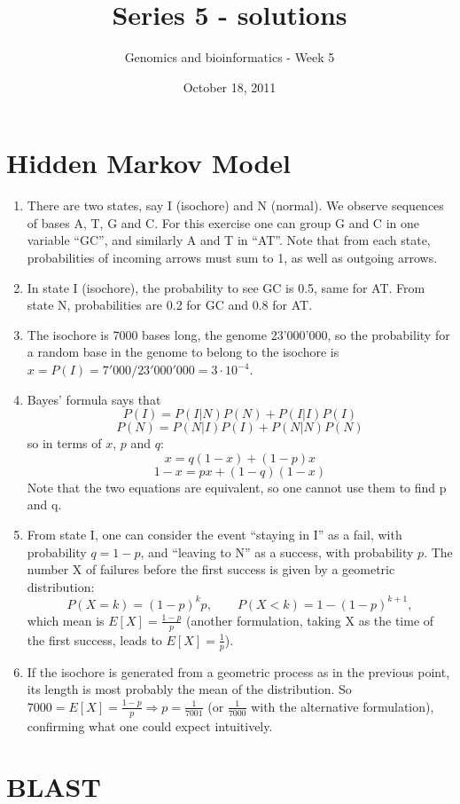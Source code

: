 \documentclass[a4paper,11pt]{article}
\title{Series 5 - solutions}
\date{October 18, 2011}
\author{Genomics and bioinformatics - Week 5}
\begin{document}
\maketitle

\section{Hidden Markov Model}
\begin{enumerate}
\item There are two states, say I (isochore) and N (normal). We observe sequences of bases A, T, G and C. For this exercise one can group G and C in one variable ``GC'', and similarly A and T in ``AT''. Note that from each state, probabilities of incoming arrows must sum to 1, as well as outgoing arrows.
\item In state I (isochore), the probability to see GC is 0.5, same for AT. From state N, probabilities are 0.2 for GC and 0.8 for AT.
\item The isochore is 7000 bases long, the genome 23'000'000, so the probability for a random base in the genome to belong to the isochore is $x = P(I) = 7'000/23'000'000 = 3\cdot 10^{-4}$.
\item Bayes' formula says that 
$$ P(I) = P(I|N)P(N) + P(I|I)P(I) $$
$$ P(N) = P(N|I)P(I) + P(N|N)P(N) $$
so in terms of $x$, $p$ and $q$:
$$ x = q(1-x) + (1-p)x $$
$$ 1-x = px + (1-q)(1-x) $$
Note that the two equations are equivalent, so one cannot use them to find p and q.
\item From state I, one can consider the event ``staying in I'' as a fail, with probability $q=1-p$, and ``leaving to N'' as a success, with probability $p$. The number X of failures before the first success is given by a geometric distribution:
$$ P(X=k) = (1-p)^k p, \qquad P(X<k) = 1-(1-p)^{k+1}, $$
which mean is $E[X] = \frac{1-p}{p}$ (another formulation, taking X as the time of the first success, leads to $E[X] = \frac{1}{p}$).
\item If the isochore is generated from a geometric process as in the previous point, its length is most probably the mean of the distribution. So $7000 = E[X] = \frac{1-p}{p} \Rightarrow p = \frac{1}{7001}$ (or $\frac{1}{7000}$ with the alternative formulation), confirming what one could expect intuitively.
\end{enumerate}

\section{BLAST}
\end{document}

